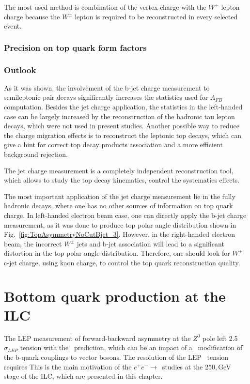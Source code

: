 The most used method is combination of the vertex charge with the $W^\pm$ lepton charge because the $W^\pm$ lepton is required to be reconstructed in every selected event. 
\subsubsection{Precision on top quark form factors }

\subsubsection{Outlook}
As it was shown, the involvement of the b-jet charge measurement to semileptonic \ttbar pair decays significantly increases the statistics used for $A_{FB}$ computation.
Besides the jet charge application, the statistics in the left-handed case can be largely increased by the reconstruction of the hadronic tau lepton decays, which were not used in present studies. 
Another possible way to reduce the charge migration effects is to reconstruct the leptonic top decays, which can give a hint for correct top decay products association and a more efficient background rejection.

The jet charge measurement is a completely independent reconstruction tool, which allows to study the top decay kinematics, control the systematics effects.

The most important application of the jet charge measurement lie in the fully hadronic \ttbar decays, where one has no other sources of information on top quark charge. 
In left-handed electron beam case, one can directly apply the b-jet charge measurement, as it was done to produce top polar angle distribution shown in Fig.~\ref{fig:TopAsymmetryNoCutBjet_3}. 
However, in the right-handed electron beam, the incorrect $W^\pm$ jets and b-jet association will lead to a significant distortion in the top polar angle distribution. Therefore, one should look for $W^\pm$ c-jet charge, using kaon charge, to control the top quark reconstruction quality. 
\section{Bottom quark production at the ILC}
The LEP measurement of forward-backward asymmetry at the $Z^0$ pole left 2.5$\sigma_{LEP}$ tension with the \sm\ prediction, which can be an impact of a \bsm\ modification of the b-quark couplings to vector bosons.
The resolution of the LEP \afbb\ tension requires 
This is the main motivation of the $e^+e^-\to$\bbbar\ studies at the $250$,\,GeV stage of the ILC, which are presented in this chapter. 

